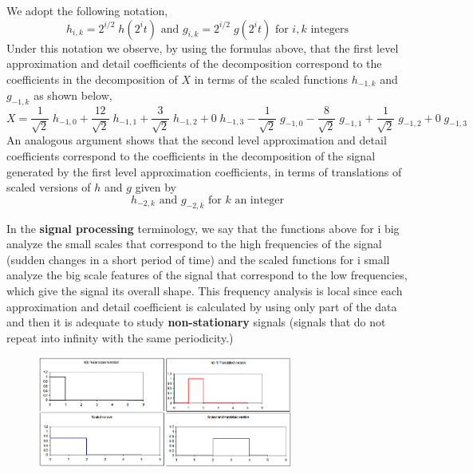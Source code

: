We adopt the following notation,
	\[
	h_{i,k}=2^{i/2} \; h(2^it) \text{ and } g_{i,k}=2^{i/2}\; g(2^it) \text{ for }i,k \text{ integers}
	\]
Under this notation we observe, by using the formulas above, that the first level approximation and detail coefficients of the decomposition correspond to the coefficients in the decomposition of $X$ in terms of the scaled functions $h_{-1,k}$ and $g_{-1,k}$ as shown below,
	\[
	X= \frac{1}{\sqrt{2}}\; h_{-1,0}+ \frac{12}{\sqrt{2}}\; h_{-1,1}+ \frac{3}{\sqrt{2}}\; h_{-1,2}+0 \; h_{-1,3} - \frac{1}{\sqrt{2}}\; g_{-1,0} - \frac{8}{\sqrt{2}}\; g_{-1,1} + \frac{1}{\sqrt{2}}\; g_{-1,2} + 0\; g_{-1,3}
	\]
An analogous argument shows that the second level approximation and detail coefficients correspond to the coefficients in the decomposition of the signal generated by the first level approximation coefficients, in terms of translations of scaled versions of $h$ and $g$ given by 
	\[
	h_{-2,k} \text{ and } g_{-2,k} \text{ for } k \text{ an integer}
	\]

In the \textbf{signal processing} terminology, we say that the functions above for i big analyze the small scales that correspond to the high frequencies of the signal (sudden changes in a short period of time) and the scaled functions for i small analyze the big scale features of the signal that correspond to the low frequencies, which give the signal its overall shape. This frequency analysis is local since each approximation and detail coefficient is calculated by using only part of the data and then it is adequate to study \textbf{non-stationary} signals (signals that do not repeat into infinity with the same periodicity.) \\

 \vspace{0.2cm}

\begin{figure}[H]
   \centering
   \includegraphics[width=0.75\textwidth]{season1/107/images/haar.png} 
\end{figure}

